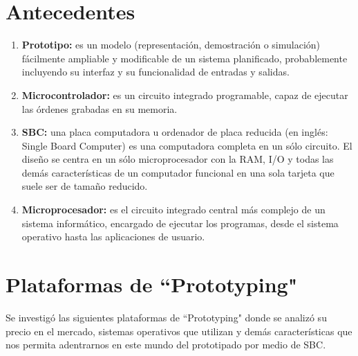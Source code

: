 \documentclass[conference]{IEEEtran}
\begin{document}
\section{Antecedentes}\label{sec:ant}
\begin{enumerate}
\item\textbf{ Prototipo:} es un modelo (representación, demostración o simulación) fácilmente ampliable y modificable de un sistema planificado, probablemente incluyendo su interfaz y su funcionalidad de entradas y salidas.
\item \textbf{Microcontrolador:} es un circuito integrado programable, capaz de ejecutar las órdenes grabadas en su memoria.
\item \textbf{SBC:} una placa computadora u ordenador de placa reducida (en inglés: Single Board Computer) es una computadora completa en un sólo circuito. El diseño se centra en un sólo microprocesador con la RAM, I/O y todas las demás características de un computador funcional en una sola tarjeta que suele ser de tamaño reducido.
\item \textbf{Microprocesador:} es el circuito integrado central más complejo de un sistema informático, encargado de ejecutar los programas, desde el sistema operativo hasta las aplicaciones de usuario.
\end{enumerate}

\section{Plataformas de ``Prototyping"}\label{sec:esc}
Se investigó las siguientes plataformas de ``Prototyping" donde se analizó su precio en el mercado, sistemas operativos que utilizan y demás características que nos permita adentrarnos en este mundo del prototipado por medio de SBC.
\end{document}
